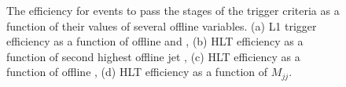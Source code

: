 \begin{figure}
  \caption{The efficiency for events to pass the stages of the trigger criteria as a function of their values of several offline variables. (a) \ac{L1} trigger efficiency as a function of offline \MET and \METnoMU, (b) \ac{HLT} efficiency as a function of second highest offline jet \pt, (c) \ac{HLT} efficiency as a function of offline \MET, (d) \ac{HLT} efficiency as a function of $M_{jj}$.}
  \label{fig:prompttrigplots}
\end{figure}

